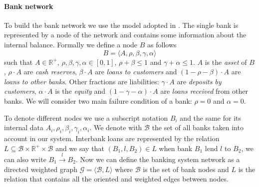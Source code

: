 \documentclass[a4paper, 11pt]{article}
\begin{document}
\paragraph{Bank network} %
To build the bank network we use the model adopted in \cite{KrauseGiansante}. The single bank is represented by a node of the network and contains some information about the internal balance. Formally we define a node $B$ as follows
$$ B = \langle A,\rho,\beta,\gamma,\alpha \rangle $$
such that $A \in \mathbb{R}^+$, $\rho,\beta,\gamma,\alpha \in [0,1]$, $\rho + \beta \leq 1$ and $\gamma + \alpha \leq 1$. $A$ is the \emph{asset} of $B$, $\rho \cdot A$ are \emph{cash reserves}, $\beta \cdot A$ are \emph{loans to customers} and $(1-\rho-\beta) \cdot A$ are \emph{loans to other banks}. Other fractions are liabilities: $\gamma \cdot A$ are \emph{deposits by customers}, $\alpha \cdot A$ is the \emph{equity} and $(1-\gamma-\alpha) \cdot A$ are \emph{loans received} from other banks. We will consider two main failure condition of a bank: $\rho = 0$ and $\alpha = 0$.

To denote different nodes we use a subscript notation $B_i$ and the same for its internal data $A_i,\rho_i,\beta_i,\gamma_i,\alpha_i$. We denote with $\mathcal{B}$ the set of all banks taken into account in our system.
Interbank loans are represented by the relation $L \subseteq \mathcal{B} \times \mathbb{R^+} \times \mathcal{B}$ and we say that $(B_1,l,B_2) \in L$ when bank $B_1$ lend $l$ to $B_2$, we can also write $B_1 \xrightarrow{l} B_2$.
Now we can define the banking system network as a directed weighted graph $\mathcal{G} = \langle \mathcal{B}, L \rangle$ where $\mathcal{B}$ is the set of bank nodes and $L$ is the relation that contains all the oriented and weighted edges between nodes.
\end{document}
